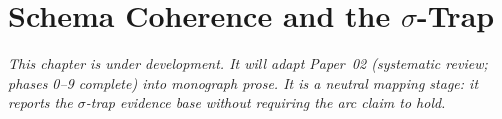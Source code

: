 \chapter{Schema Coherence and the $\sigma$-Trap}
\label{ch:sigma-trap-evidence}

\textit{This chapter is under development. It will adapt Paper~02 (systematic review;
phases 0--9 complete) into monograph prose. It is a neutral mapping stage: it reports the
$\sigma$-trap evidence base without requiring the arc claim to hold.}

